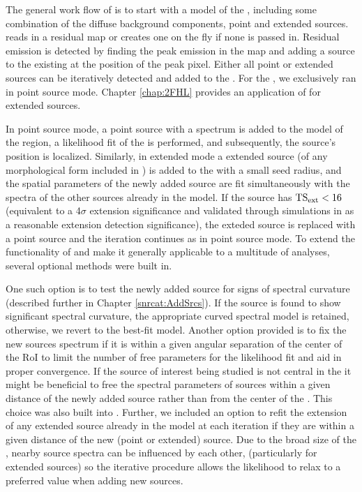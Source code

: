 {The general work flow of \srcs{} is to start with a model of the \roi{}, including some combination of the diffuse background components, point  and extended sources. \srcs{} reads in a residual \ts{} map or creates one on the fly if none is passed in. Residual emission is detected by finding the peak emission in the \ts{} map and adding a source to the existing \roi{} at the position of the peak pixel. Either all point or extended sources can be iteratively detected and added to the \roi{}. For the \snrcat{}, we exclusively ran \srcs{} in point source mode. Chapter \ref{chap:2FHL} provides an application of \srcs{} for extended sources. 

In point source mode, a point source with a \pl{} spectrum is added to the model of the region, a likelihood fit of the \roi{} is performed, and subsequently, the source's position is localized. Similarly, in extended mode a \pl{} extended source (of any morphological form included in \ptlike{}) is added to the \roi{} with a small seed radius, and the spatial parameters of the newly added source are fit simultaneously with the spectra of the other sources already in the model. If the source has ${\rm TS_{ext} < 16}$ (equivalent to a  4$\sigma$ extension significance and validated through simulations in \cite{Lande12} as a reasonable extension detection significance), the exteded source is replaced with a point source and the iteration continues as in point source mode. To extend the functionality of \srcs{} and make it generally applicable to a multitude of \lat{} analyses, several optional methods were built in. 

One such option is to test the newly added source for signs of spectral curvature (described further in Chapter \ref{snrcat:AddSrcs}). If the source is found to show significant spectral curvature, the appropriate curved spectral model is retained, otherwise, we revert to the best-fit \pl{} model. Another option provided is to fix the new sources spectrum if it is within a given angular separation of the center of the RoI to limit the number of free parameters for the likelihood fit and aid in proper convergence. If the source of interest being studied is not central in the \roi{} it might be beneficial to free the spectral parameters of sources within a given distance of the newly added source rather than from the center of the \roi{}. This choice was also built into \srcs{}. Further, we included an option to refit the extension of any extended source already in the model at each iteration if they are within a given distance of the new (point or extended) source. Due to the broad size of the \psf{}, nearby source spectra can be influenced by each other, (particularly for extended sources) so the iterative procedure allows the likelihood to relax to a preferred value when adding new sources.

}
